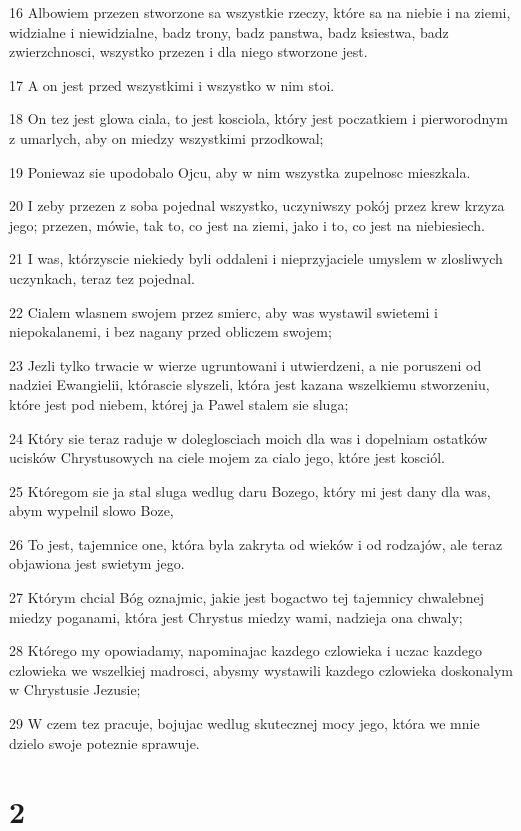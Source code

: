 \par 16 Albowiem przezen stworzone sa wszystkie rzeczy, które sa na niebie i na ziemi, widzialne i niewidzialne, badz trony, badz panstwa, badz ksiestwa, badz zwierzchnosci, wszystko przezen i dla niego stworzone jest.
\par 17 A on jest przed wszystkimi i wszystko w nim stoi.
\par 18 On tez jest glowa ciala, to jest kosciola, który jest poczatkiem i pierworodnym z umarlych, aby on miedzy wszystkimi przodkowal;
\par 19 Poniewaz sie upodobalo Ojcu, aby w nim wszystka zupelnosc mieszkala.
\par 20 I zeby przezen z soba pojednal wszystko, uczyniwszy pokój przez krew krzyza jego; przezen, mówie, tak to, co jest na ziemi, jako i to, co jest na niebiesiech.
\par 21 I was, którzyscie niekiedy byli oddaleni i nieprzyjaciele umyslem w zlosliwych uczynkach, teraz tez pojednal.
\par 22 Cialem wlasnem swojem przez smierc, aby was wystawil swietemi i niepokalanemi, i bez nagany przed obliczem swojem;
\par 23 Jezli tylko trwacie w wierze ugruntowani i utwierdzeni, a nie poruszeni od nadziei Ewangielii, którascie slyszeli, która jest kazana wszelkiemu stworzeniu, które jest pod niebem, której ja Pawel stalem sie sluga;
\par 24 Który sie teraz raduje w doleglosciach moich dla was i dopelniam ostatków ucisków Chrystusowych na ciele mojem za cialo jego, które jest kosciól.
\par 25 Któregom sie ja stal sluga wedlug daru Bozego, który mi jest dany dla was, abym wypelnil slowo Boze,
\par 26 To jest, tajemnice one, która byla zakryta od wieków i od rodzajów, ale teraz objawiona jest swietym jego.
\par 27 Którym chcial Bóg oznajmic, jakie jest bogactwo tej tajemnicy chwalebnej miedzy poganami, która jest Chrystus miedzy wami, nadzieja ona chwaly;
\par 28 Którego my opowiadamy, napominajac kazdego czlowieka i uczac kazdego czlowieka we wszelkiej madrosci, abysmy wystawili kazdego czlowieka doskonalym w Chrystusie Jezusie;
\par 29 W czem tez pracuje, bojujac wedlug skutecznej mocy jego, która we mnie dzielo swoje poteznie sprawuje.

\chapter{2}

